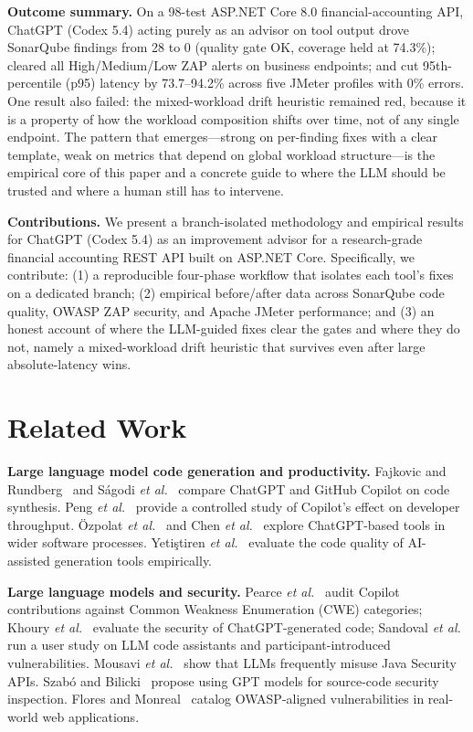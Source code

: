 \documentclass[conference,letterpaper]{IEEEtran}
\begin{document}
\textbf{Outcome summary.} On a 98-test ASP.NET Core 8.0 financial-accounting API, ChatGPT (Codex 5.4) acting purely as an advisor on tool output drove SonarQube findings from 28 to 0 (quality gate OK, coverage held at 74.3\%); cleared all High/Medium/Low ZAP alerts on business endpoints; and cut 95th-percentile (p95) latency by 73.7--94.2\% across five JMeter profiles with 0\% errors. One result also failed: the mixed-workload drift heuristic remained red, because it is a property of how the workload composition shifts over time, not of any single endpoint. The pattern that emerges---strong on per-finding fixes with a clear template, weak on metrics that depend on global workload structure---is the empirical core of this paper and a concrete guide to where the LLM should be trusted and where a human still has to intervene.

\textbf{Contributions.} We present a branch-isolated methodology and empirical results for ChatGPT (Codex 5.4) as an improvement advisor for a research-grade financial accounting REST API built on ASP.NET Core. Specifically, we contribute: (1) a reproducible four-phase workflow that isolates each tool's fixes on a dedicated branch; (2) empirical before/after data across SonarQube code quality, OWASP ZAP security, and Apache JMeter performance; and (3) an honest account of where the LLM-guided fixes clear the gates and where they do not, namely a mixed-workload drift heuristic that survives even after large absolute-latency wins.

\section{Related Work}
\textbf{Large language model code generation and productivity.} Fajkovic and Rundberg~\cite{ref1} and S\'agodi \textit{et al.}~\cite{ref2} compare ChatGPT and GitHub Copilot on code synthesis. Peng \textit{et al.}~\cite{ref10} provide a controlled study of Copilot's effect on developer throughput. \"Ozpolat \textit{et al.}~\cite{ref3} and Chen \textit{et al.}~\cite{ref4} explore ChatGPT-based tools in wider software processes. Yeti\c stiren \textit{et al.}~\cite{ref8} evaluate the code quality of AI-assisted generation tools empirically.

\textbf{Large language models and security.} Pearce \textit{et al.}~\cite{ref11} audit Copilot contributions against Common Weakness Enumeration (CWE) categories; Khoury \textit{et al.}~\cite{ref12} evaluate the security of ChatGPT-generated code; Sandoval \textit{et al.}~\cite{ref13} run a user study on LLM code assistants and participant-introduced vulnerabilities. Mousavi \textit{et al.}~\cite{ref6} show that LLMs frequently misuse Java Security APIs. Szab\'o and Bilicki~\cite{ref7} propose using GPT models for source-code security inspection. Flores and Monreal~\cite{ref9} catalog OWASP-aligned vulnerabilities in real-world web applications.
\end{document}
